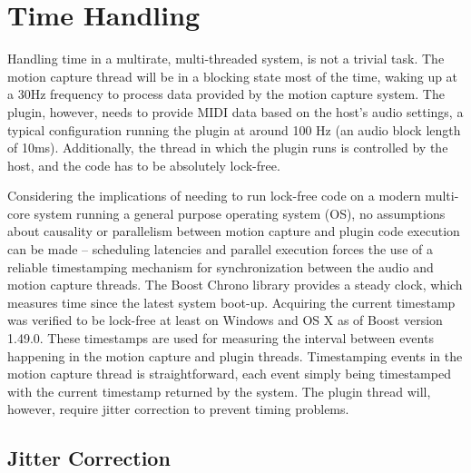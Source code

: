 \section{Time Handling}

Handling time in a multirate, multi-threaded system,
is not a trivial task.
The motion capture thread will be in
a blocking state most of the time,
waking up at a 30Hz frequency to process data
provided by the motion capture system.
The plugin, however, needs to provide MIDI data
based on the host's audio settings,
a typical configuration running the
plugin at around 100 Hz (an audio block length of 10ms).
Additionally, the thread in which the plugin runs
is controlled by the host,
and the code has to be absolutely lock-free.

Considering the implications of needing to run lock-free code on
a modern multi-core system running a general purpose
operating system (OS),
no assumptions about causality or parallelism between
motion capture and plugin code execution can be made --
scheduling latencies and parallel execution forces the use
of a reliable timestamping mechanism for synchronization between
the audio and motion capture threads.
The Boost Chrono library provides a steady clock,
which measures time since the latest system boot-up.
Acquiring the current timestamp was verified to be lock-free
at least on Windows and OS X as of Boost version 1.49.0.
These timestamps are used for measuring the interval between
events happening in the motion capture and plugin threads.
Timestamping events in the motion capture thread is straightforward,
each event simply being timestamped with
the current timestamp returned by the system.
The plugin thread will, however,
require jitter correction to prevent timing problems.

\subsection{Jitter Correction}

